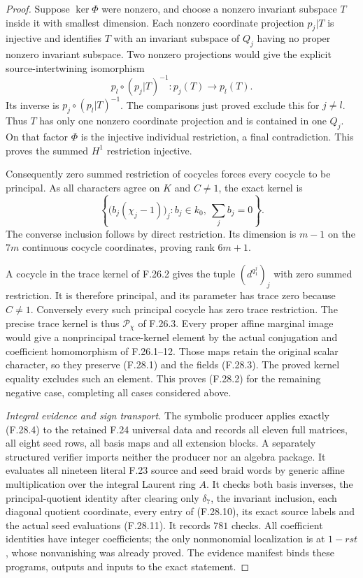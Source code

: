 \begin{proof}
Suppose $\ker\Phi$ were nonzero, and choose a
nonzero invariant subspace $T$ inside it with
smallest dimension. Each nonzero coordinate
projection $p_j|T$ is injective and identifies
$T$ with an invariant subspace of $Q_j$ having
no proper nonzero invariant subspace. Two
nonzero projections would give the explicit
source-intertwining isomorphism
\[
                  p_l\circ(p_j|T)^{-1}:p_j(T)\longrightarrow p_l(T).
                                                               \tag{F.28.15}
\]
Its inverse is $p_j\circ(p_l|T)^{-1}$.
The comparisons just proved exclude this for
$j\ne l$. Thus $T$ has only one nonzero coordinate
projection and is contained in one $Q_j$.
On that factor $\Phi$ is the injective individual
restriction, a final contradiction. This proves
the summed $H^1$ restriction injective.

Consequently zero summed restriction of cocycles
forces every cocycle to be principal. As all
characters agree on $K$ and $C\ne1$, the exact
kernel is
\[
 \left\{\bigl(b_j(\chi_j-1)\bigr)_j:
                 b_j\in k_0,\ \sum_jb_j=0\right\}.
                                                               \tag{F.28.16}
\]
The converse inclusion follows by direct restriction.
Its dimension is $m-1$ on the $7m$ continuous
cocycle coordinates, proving rank $6m+1$.

A cocycle in the trace kernel of F.26.2 gives
the tuple $(d^{q_1^j})_j$ with zero summed
restriction. It is therefore principal, and
its parameter has trace zero because $C\ne1$.
Conversely every such principal cocycle has
zero trace restriction. The precise trace
kernel is thus $\mathscr P_\chi$ of F.26.3.
Every proper affine marginal image would give
a nonprincipal trace-kernel element by the
actual conjugation and coefficient homomorphism
of F.26.1--12. Those maps retain the original
scalar character, so they preserve (F.28.1)
and the fields (F.28.3). The proved kernel
equality excludes such an element. This
proves (F.28.2) for the remaining negative
case, completing all cases considered above.

\emph{Integral evidence and sign transport.}
The symbolic producer applies exactly (F.28.4)
to the retained F.24 universal data and records
all eleven full matrices, all eight seed rows,
all basis maps and all extension blocks.
A separately structured verifier imports
neither the producer nor an algebra package.
It evaluates all nineteen literal F.23 source
and seed braid words by generic affine
multiplication over the integral Laurent ring
$A$. It checks both basis inverses, the
principal-quotient identity after clearing
only $\delta_7$, the invariant inclusion,
each diagonal quotient coordinate, every
entry of (F.28.10), its exact source labels
and the actual seed evaluations (F.28.11).
It records $781$ checks. All coefficient
identities have integer coefficients; the
only nonmonomial localization is at $1-rst$,
whose nonvanishing was already proved.
The evidence manifest binds these programs,
outputs and inputs to the exact statement.


\end{proof}
